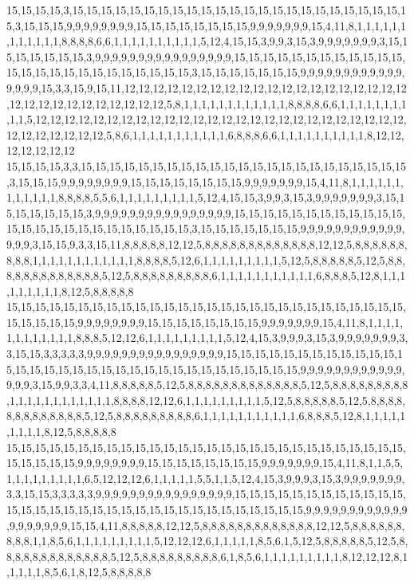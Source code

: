 15,15,15,15,3,15,15,15,15,15,15,15,15,15,15,15,15,15,15,15,15,15,15,15,15,15,15,15,15,3,15,15,15,9,9,9,9,9,9,9,9,15,15,15,15,15,15,15,15,9,9,9,9,9,9,9,15,4,11,8,1,1,1,1,1,1,1,1,1,1,1,1,8,8,8,8,6,6,1,1,1,1,1,1,1,1,1,1,5,12,4,15,15,3,9,9,3,15,3,9,9,9,9,9,9,9,3,15,15,15,15,15,15,15,3,9,9,9,9,9,9,9,9,9,9,9,9,9,9,9,9,15,15,15,15,15,15,15,15,15,15,15,15,15,15,15,15,15,15,15,15,15,15,15,15,15,3,15,15,15,15,15,15,15,9,9,9,9,9,9,9,9,9,9,9,9,9,9,9,9,15,3,3,15,9,15,11,12,12,12,12,12,12,12,12,12,12,12,12,12,12,12,12,12,12,12,12,12,12,12,12,12,12,12,12,12,12,12,5,8,1,1,1,1,1,1,1,1,1,1,1,1,8,8,8,8,6,6,1,1,1,1,1,1,1,1,1,1,5,12,12,12,12,12,12,12,12,12,12,12,12,12,12,12,12,12,12,12,12,12,12,12,12,12,12,12,12,12,12,12,12,12,5,8,6,1,1,1,1,1,1,1,1,1,1,1,6,8,8,8,6,6,1,1,1,1,1,1,1,1,1,1,8,12,12,12,12,12,12,12
15,15,15,15,3,3,15,15,15,15,15,15,15,15,15,15,15,15,15,15,15,15,15,15,15,15,15,15,15,3,15,15,15,9,9,9,9,9,9,9,9,15,15,15,15,15,15,15,15,9,9,9,9,9,9,9,15,4,11,8,1,1,1,1,1,1,1,1,1,1,1,1,8,8,8,8,5,5,6,1,1,1,1,1,1,1,1,1,5,12,4,15,15,3,9,9,3,15,3,9,9,9,9,9,9,9,3,15,15,15,15,15,15,15,3,9,9,9,9,9,9,9,9,9,9,9,9,9,9,9,9,15,15,15,15,15,15,15,15,15,15,15,15,15,15,15,15,15,15,15,15,15,15,15,15,15,3,15,15,15,15,15,15,15,9,9,9,9,9,9,9,9,9,9,9,9,9,9,9,3,15,15,9,3,3,15,11,8,8,8,8,8,12,12,5,8,8,8,8,8,8,8,8,8,8,8,8,8,12,12,5,8,8,8,8,8,8,8,8,8,1,1,1,1,1,1,1,1,1,1,1,1,8,8,8,8,5,12,6,1,1,1,1,1,1,1,1,1,5,12,5,8,8,8,8,8,5,12,5,8,8,8,8,8,8,8,8,8,8,8,8,8,5,12,5,8,8,8,8,8,8,8,8,8,6,1,1,1,1,1,1,1,1,1,1,1,6,8,8,8,5,12,8,1,1,1,1,1,1,1,1,1,8,12,5,8,8,8,8,8
15,15,15,15,15,15,15,15,15,15,15,15,15,15,15,15,15,15,15,15,15,15,15,15,15,15,15,15,15,15,15,15,15,9,9,9,9,9,9,9,9,15,15,15,15,15,15,15,15,9,9,9,9,9,9,9,15,4,11,8,1,1,1,1,1,1,1,1,1,1,1,1,8,8,8,5,12,12,6,1,1,1,1,1,1,1,1,1,5,12,4,15,3,9,9,9,3,15,3,9,9,9,9,9,9,9,3,3,15,15,3,3,3,3,3,9,9,9,9,9,9,9,9,9,9,9,9,9,9,9,9,15,15,15,15,15,15,15,15,15,15,15,15,15,15,15,15,15,15,15,15,15,15,15,15,15,15,15,15,15,15,15,15,15,9,9,9,9,9,9,9,9,9,9,9,9,9,9,9,3,15,9,9,3,3,4,11,8,8,8,8,8,5,12,5,8,8,8,8,8,8,8,8,8,8,8,8,8,5,12,5,8,8,8,8,8,8,8,8,8,1,1,1,1,1,1,1,1,1,1,1,1,8,8,8,8,12,12,6,1,1,1,1,1,1,1,1,1,5,12,5,8,8,8,8,8,5,12,5,8,8,8,8,8,8,8,8,8,8,8,8,8,5,12,5,8,8,8,8,8,8,8,8,8,6,1,1,1,1,1,1,1,1,1,1,1,6,8,8,8,5,12,8,1,1,1,1,1,1,1,1,1,8,12,5,8,8,8,8,8
15,15,15,15,15,15,15,15,15,15,15,15,15,15,15,15,15,15,15,15,15,15,15,15,15,15,15,15,15,15,15,15,15,9,9,9,9,9,9,9,9,15,15,15,15,15,15,15,15,9,9,9,9,9,9,9,15,4,11,8,1,1,5,5,1,1,1,1,1,1,1,1,1,6,5,12,12,12,6,1,1,1,1,1,5,5,1,1,5,12,4,15,3,9,9,9,3,15,3,9,9,9,9,9,9,9,3,3,15,15,3,3,3,3,3,9,9,9,9,9,9,9,9,9,9,9,9,9,9,9,9,15,15,15,15,15,15,15,15,15,15,15,15,15,15,15,15,15,15,15,15,15,15,15,15,15,15,15,15,15,15,15,15,15,9,9,9,9,9,9,9,9,9,9,9,9,9,9,9,9,9,9,9,15,15,4,11,8,8,8,8,8,12,12,5,8,8,8,8,8,8,8,8,8,8,8,8,8,12,12,5,8,8,8,8,8,8,8,8,8,1,1,8,5,6,1,1,1,1,1,1,1,1,1,5,12,12,12,6,1,1,1,1,1,8,5,6,1,5,12,5,8,8,8,8,8,5,12,5,8,8,8,8,8,8,8,8,8,8,8,8,8,5,12,5,8,8,8,8,8,8,8,8,8,6,1,8,5,6,1,1,1,1,1,1,1,1,1,8,12,12,12,8,1,1,1,1,1,8,5,6,1,8,12,5,8,8,8,8,8
